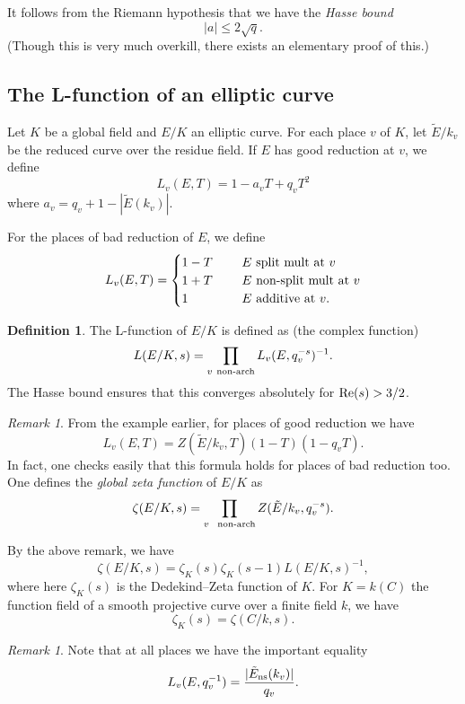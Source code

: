 \documentclass[12pt]{amsart}
\numberwithin{equation}{section}
\theoremstyle{remark}
\newtheorem{remark}[equation]{Remark}
\theoremstyle{definition}
\theoremstyle{definition}
\theoremstyle{definition}
\newtheorem{defi}[equation]{Definition}
\theoremstyle{definition}
\theoremstyle{definition}
\theoremstyle{definition}
\theoremstyle{definition}
\begin{document}
It follows from the Riemann hypothesis that we have the \textit{Hasse bound}
\[|a|\leq 2\sqrt{q}.\]
(Though this is very much overkill, there exists an elementary proof of this.)


\subsection{The L-function of an elliptic curve}

Let $K$ be a global field and $E/K$ an elliptic curve. For each place $v$ of $K$, let $\tilde{E}/k_v$ be the reduced curve over the residue field.  If $E$ has good reduction at $v$, we define 
\[L_v(E,T)=1-a_vT+q_vT^2\]
where $a_v=q_v+1-|\tilde{E}(k_v)|$.

For the places of bad reduction of $E$, we define
\[L_v(E,T)=\begin{cases}1-T~~&~~E\textup{ split mult at }v\\ 
1+T~~&~~E\textup{ non-split mult at }v\\ 1~~&~~ E\textup{ additive at }v.\end{cases}\]

\begin{defi}
The L-function of $E/K$ is defined as (the complex function)
\[L(E/K,s)=\prod_{v~\textup{non-arch}}L_v(E,q_v^{-s})^{-1}.\]
The Hasse bound ensures that this converges absolutely for $\textup{Re}(s)>3/2$. 
\end{defi}

\begin{remark}
From the example earlier, for places of good reduction we have
\[L_v(E,T)=Z(\tilde{E}/k_v,T)(1-T)(1-q_vT).\]
In fact, one checks easily that this formula  holds for places of bad reduction too. One defines the \textit{global zeta function} of $E/K$ as
\[\zeta(E/K,s)=\prod_{v~~\textup{non-arch}}Z(\tilde{E}/k_v,q_v^{-s}).\]

By the above remark, we have
\[\zeta(E/K,s)=\zeta_K(s)\zeta_K(s-1)L(E/K,s)^{-1},\]
where here $\zeta_K(s)$ is the Dedekind--Zeta function of $K$. For $K=k(C)$ the function field of a smooth projective curve over a finite field $k$, we have
\[\zeta_K(s)=\zeta(C/k,s).\]
\end{remark}

\begin{remark} \label{local value at 1}
Note that at all places we have the important equality
\[L_v(E,q_v^{-1})=\frac{|\tilde{E}_{\textup{ns}}(k_v)|}{q_v}.\]
\end{remark}
\end{document}
